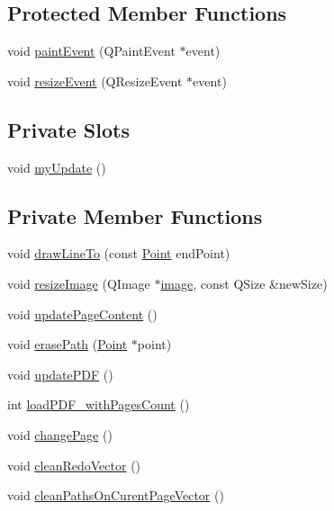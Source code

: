 \subsection*{Protected Member Functions}
\begin{DoxyCompactItemize}
\item 
void \hyperlink{classScribbleArea_a126a30e3659f6c1cdc202f10fce7e5d9}{paintEvent} (QPaintEvent $\ast$event)
\item 
void \hyperlink{classScribbleArea_aaf6be24625a5f0fe1e4a3b8eecb07575}{resizeEvent} (QResizeEvent $\ast$event)
\end{DoxyCompactItemize}
\subsection*{Private Slots}
\begin{DoxyCompactItemize}
\item 
void \hyperlink{classScribbleArea_ab51bbcc058022cbca00a0edfa724c0d3}{myUpdate} ()
\end{DoxyCompactItemize}
\subsection*{Private Member Functions}
\begin{DoxyCompactItemize}
\item 
void \hyperlink{classScribbleArea_ad5504d85e087b341d914b322088fecf5}{drawLineTo} (const \hyperlink{classPoint}{Point} endPoint)
\item 
void \hyperlink{classScribbleArea_af968a1bb4a81acf6a2462fd3ecb7c725}{resizeImage} (QImage $\ast$\hyperlink{classScribbleArea_ae55058216a87aeee72bcb1220bc3a89d}{image}, const QSize \&newSize)
\item 
void \hyperlink{classScribbleArea_a55407f71c765397a12d7efed18790c4b}{updatePageContent} ()
\item 
void \hyperlink{classScribbleArea_acab809a6b738076b7011373b4230cc36}{erasePath} (\hyperlink{classPoint}{Point} $\ast$point)
\item 
void \hyperlink{classScribbleArea_a4d7448dd926c6fdb7bf1912b81d667e8}{updatePDF} ()
\item 
int \hyperlink{classScribbleArea_a96f69face188f2138752600dd7ed0946}{loadPDF\_\-withPagesCount} ()
\item 
void \hyperlink{classScribbleArea_a898d76738b51ed00fbb3aeed87ca1ce4}{changePage} ()
\item 
void \hyperlink{classScribbleArea_affc463bc10a01e700e8bce98f83ea0c4}{cleanRedoVector} ()
\item 
void \hyperlink{classScribbleArea_aab4bb1eafc6af60c8c0e2127811c762f}{cleanPathsOnCurentPageVector} ()
\end{DoxyCompactItemize}

